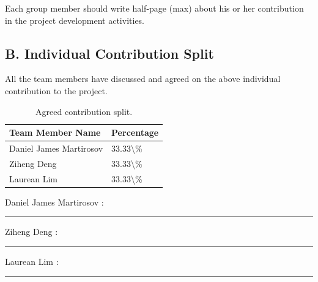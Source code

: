 \documentclass[11pt,a4paper]{article}
\begin{document}
Each group member should write half-page (max) about his or her contribution in the project development activities.
\subsection*{B. Individual Contribution Split}

All the team members have discussed and agreed on the above individual contribution to the project.
\begin{table}[htbp]
\centering
\footnotesize
\begin{tabular}{@{}p{9cm}p{5cm}@{}}
\toprule
\textbf{Team Member Name} & \textbf{Percentage} \\
\midrule
Daniel James Martirosov & 33.33\textbackslash{}\% \\
Ziheng Deng & 33.33\textbackslash{}\% \\
Laurean Lim & 33.33\textbackslash{}\% \\
\bottomrule
\end{tabular}
\caption{Agreed contribution split.}
\end{table}

Daniel James Martirosov : \rule{5cm}{0.4pt}

\vspace{0.8em}


Ziheng Deng : \rule{5cm}{0.4pt}

\vspace{0.8em}


Laurean Lim : \rule{5cm}{0.4pt}

\vspace{0.8em}
\end{document}
